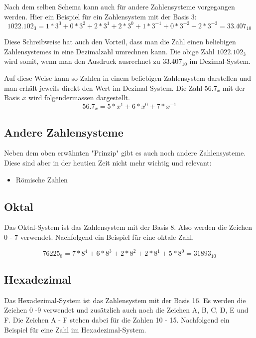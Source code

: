 \documentclass[12pt, a4paper, oneside]{article}
\begin{document}
Nach dem selben Schema kann auch für andere Zahlensysteme vorgegangen werden. Hier ein Beispiel für ein Zahlensystem mit der Basis 3:
\begin{equation}
  1022.102_{3} = 1 * 3^3 + 0 * 3^2 + 2 * 3^1 + 2 * 3^0 + 1 * 3^{-1} + 0 * 3^{-2} + 2 * 3^{-3} = 33.407_{10}
\end{equation}

Diese Schreibweise hat auch den Vorteil, dass man die Zahl einen beliebigen Zahlensystemes in eine Dezimalzahl umrechnen kann. Die obige Zahl $1022.102_{3}$ wird somit, wenn man den Ausdruck ausrechnet zu $33.407_{10}$ im Dezimal-System.

Auf diese Weise kann so Zahlen in einem beliebigen Zahlensystem darstellen und man erhält jeweils direkt den Wert im Dezimal-System. Die Zahl $56.7_{x}$ mit der Basis $x$ wird folgendermassen dargestellt.
\begin{equation}
  56.7_{x} = 5 * x^{1} + 6 * x^{0} + 7 * x^{-1}
\end{equation}

\subsection{Andere Zahlensysteme}
Neben dem oben erwähnten "Prinzip" gibt es auch noch andere Zahlensysteme. Diese sind aber in der heutien Zeit nicht mehr wichtig und relevant:
\begin{itemize}
  \item Römische Zahlen 
\end{itemize}

\subsection{Oktal}
Das Oktal-System ist das Zahlensystem mit der Basis 8. Also werden die Zeichen 0 - 7 verwendet. Nachfolgend ein Beispiel für eine oktale Zahl.

\begin{equation}
  76225_{8} = 7 * 8^{4} + 6 * 8^{3} + 2 * 8^{2} + 2 * 8^{1} + 5 * 8^{0} = 31893_{10}
\end{equation}

\subsection{Hexadezimal}
Das Hexadezimal-System ist das Zahlensystem mit der Basis 16. Es werden die Zeichen 0 -9 verwendet und zusätzlich auch noch die Zeichen A, B, C, D, E und F. Die Zeichen A - F stehen dabei für die Zahlen 10 - 15. Nachfolgend ein Beispiel für eine Zahl im Hexadezimal-System.
\end{document}
